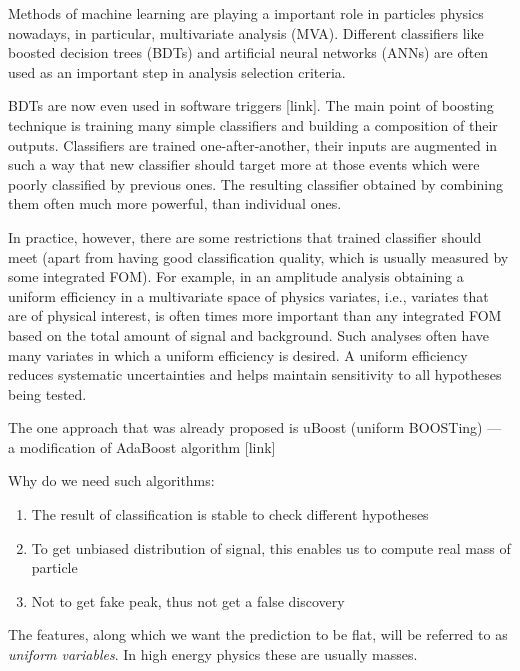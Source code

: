 Methods of machine learning are playing a important role in particles physics nowadays, in particular, multivariate analysis (MVA). 
Different classifiers like boosted decision trees (BDTs) and artificial neural networks (ANNs) are often used as an important step in analysis selection criteria. 

BDTs are now even used in software triggers [link]. The main point of boosting technique is training many simple classifiers and building a composition of their outputs.
Classifiers are trained one-after-another, their inputs are augmented in such a way that new classifier should target more at those events which were poorly classified by previous ones. The resulting classifier obtained by combining them often much more powerful, than individual ones.


In practice, however, there are some restrictions that trained classifier should meet (apart from having good classification quality, which is usually measured by some integrated FOM). For example, in an amplitude analysis obtaining a uniform efficiency in a multivariate space of physics variates, i.e., variates that are of physical interest, is often times more important than any integrated FOM based on the total amount of signal and background. Such analyses often have many variates in which a uniform efficiency is desired. A uniform efficiency reduces systematic uncertainties and helps maintain sensitivity to all hypotheses being tested.

The one approach that was already proposed is uBoost (uniform BOOSTing) --- a modification of AdaBoost algorithm [link]

Why do we need such algorithms:

\begin{enumerate}
	\item The result of classification is stable to check different hypotheses
	\item To get unbiased distribution of signal, this enables us to compute real mass of particle
	\item Not to get fake peak, thus not get a false discovery
\end{enumerate}

The features, along which we want the prediction to be flat, will be referred to as 
\textit{uniform variables}. In high energy physics these are usually masses.
